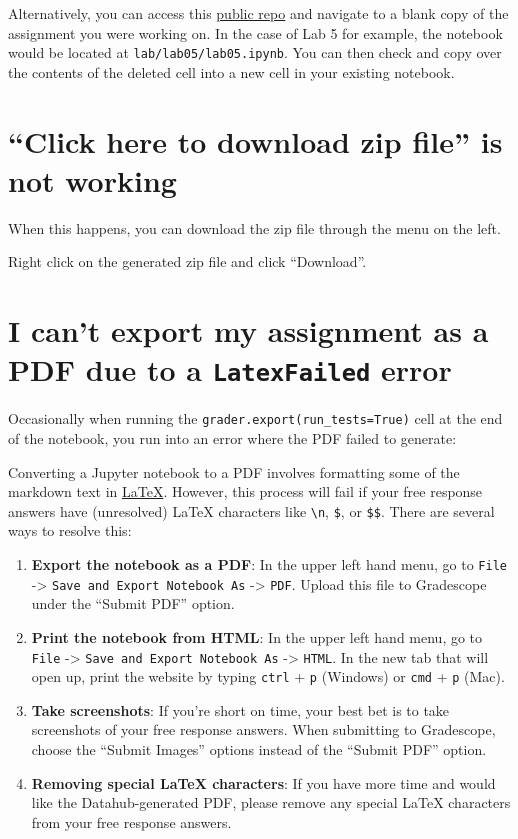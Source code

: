 \documentclass[
  letterpaper,
  DIV=11,
  numbers=noendperiod]{scrreprt}
\providecommand{\tightlist}{%
  \setlength{\itemsep}{0pt}\setlength{\parskip}{0pt}}\usepackage{longtable,booktabs,array}
\begin{document}
Alternatively, you can access this
\href{https://github.com/DS-100/fa24-student}{public repo} and navigate
to a blank copy of the assignment you were working on. In the case of
Lab 5 for example, the notebook would be located at
\texttt{lab/lab05/lab05.ipynb}. You can then check and copy over the
contents of the deleted cell into a new cell in your existing notebook.

\section{``Click here to download zip file'' is not
working}\label{click-here-to-download-zip-file-is-not-working}

When this happens, you can download the zip file through the menu on the
left.

Right click on the generated zip file and click ``Download''.

\section{\texorpdfstring{I can't export my assignment as a PDF due to a
\texttt{LatexFailed}
error}{I can't export my assignment as a PDF due to a LatexFailed error}}\label{i-cant-export-my-assignment-as-a-pdf-due-to-a-latexfailed-error}

Occasionally when running the \texttt{grader.export(run\_tests=True)}
cell at the end of the notebook, you run into an error where the PDF
failed to generate:

Converting a Jupyter notebook to a PDF involves formatting some of the
markdown text in \href{https://www.latex-project.org/}{LaTeX}. However,
this process will fail if your free response answers have (unresolved)
LaTeX characters like \texttt{\textbackslash{}n}, \texttt{\$}, or
\texttt{\$\$}. There are several ways to resolve this:

\begin{enumerate}
\def\labelenumi{\arabic{enumi}.}
\tightlist
\item
  \textbf{Export the notebook as a PDF}: In the upper left hand menu, go
  to \texttt{File} -\textgreater{}
  \texttt{Save\ and\ Export\ Notebook\ As} -\textgreater{} \texttt{PDF}.
  Upload this file to Gradescope under the ``Submit PDF'' option.
\item
  \textbf{Print the notebook from HTML}: In the upper left hand menu, go
  to \texttt{File} -\textgreater{}
  \texttt{Save\ and\ Export\ Notebook\ As} -\textgreater{}
  \texttt{HTML}. In the new tab that will open up, print the website by
  typing \texttt{ctrl} + \texttt{p} (Windows) or \texttt{cmd} +
  \texttt{p} (Mac).
\item
  \textbf{Take screenshots}: If you're short on time, your best bet is
  to take screenshots of your free response answers. When submitting to
  Gradescope, choose the ``Submit Images'' options instead of the
  ``Submit PDF'' option.
\item
  \textbf{Removing special LaTeX characters}: If you have more time and
  would like the Datahub-generated PDF, please remove any special LaTeX
  characters from your free response answers.
\end{enumerate}
\end{document}
